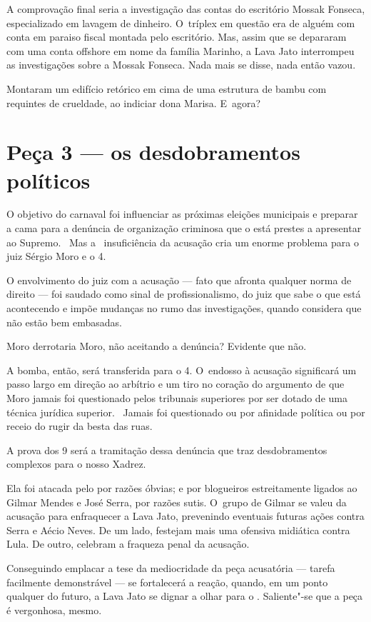 A comprovação final seria a investigação das contas do escritório Mossak
Fonseca, especializado em lavagem de dinheiro. O~tríplex em questão era
de alguém com conta em paraiso fiscal montada pelo escritório. Mas,
assim que se depararam com uma conta offshore em nome da família
Marinho, a Lava Jato interrompeu as investigações sobre a Mossak
Fonseca. Nada mais se disse, nada então vazou.

Montaram um edifício retórico em cima de uma estrutura de bambu com
requintes de crueldade, ao indiciar dona Marisa. E~agora?

\section{Peça 3 --- os desdobramentos políticos}

O objetivo do carnaval foi influenciar as próximas eleições municipais e
preparar a cama para a denúncia de organização criminosa que o  está
prestes a apresentar ao Supremo. ~Mas a ~insuficiência da acusação cria
um enorme problema para o juiz Sérgio Moro e o 4.

O envolvimento do juiz com a acusação --- fato que afronta qualquer
norma de direito --- foi saudado como sinal de profissionalismo, do juiz
que sabe o que está acontecendo e impõe mudanças no rumo das
investigações, quando considera que não estão bem embasadas.

Moro derrotaria Moro, não aceitando a denúncia? Evidente que não.

A bomba, então, será transferida para o 4. O~endosso à acusação
significará um passo largo em direção ao arbítrio e um tiro no coração
do argumento de que Moro jamais foi questionado pelos tribunais
superiores por ser dotado de uma técnica jurídica superior. ~Jamais foi
questionado ou por afinidade política ou por receio do rugir da besta
das ruas.

A prova dos 9 será a tramitação dessa denúncia que traz desdobramentos
complexos para o nosso Xadrez.

Ela foi atacada pelo  por razões óbvias; e por blogueiros
estreitamente ligados ao Gilmar Mendes e José Serra, por razões sutis. O~grupo de Gilmar se valeu da acusação para enfraquecer a Lava Jato,
prevenindo eventuais futuras ações contra Serra e Aécio Neves. De um
lado, festejam mais uma ofensiva midiática contra Lula. De outro,
celebram a fraqueza penal da acusação.

Conseguindo emplacar a tese da mediocridade da peça acusatória ---
tarefa facilmente demonstrável --- se fortalecerá a reação, quando, em
um ponto qualquer do futuro, a Lava Jato se dignar a olhar para o .
Saliente"-se que a peça é vergonhosa, mesmo.

